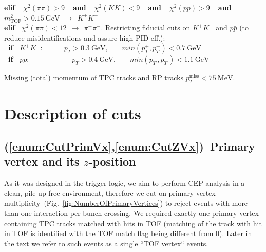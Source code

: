 \begin{enumerate}[label=\textbf{\hyperref[sec:C\arabic*]{C\arabic*}},ref=C\arabic*]
\begin{enumerate}[label=\textbf{\theenumi.\arabic*},ref=\theenumi.\arabic*]
        \textbf{elif~~}$\chi^{2}(\pi\pi)>9$\textbf{~~and~~}$\chi^{2}(KK)<9$\textbf{~~and~~}$\chi^{2}(pp)>9$\textbf{~~and~~}$m^{2}_{\text{TOF}}>0.15~\text{GeV}~~\rightarrow~~K^{+}K^{-}$\\[5pt]%
        \textbf{elif~} $\chi^{2}(\pi\pi)<12~~\rightarrow~~\pi^{+}\pi^{-}$.%
      \itemm Restricting fiducial cuts on $K^{+}K^{-}$ and $p\bar{p}$ (to reduce misidentifications and assure high PID eff.):\label{enum:CutPidPtLimits}\\[2pt]
      \textbf{~if~} $K^{+}K^{-}$:~~~~~~$p_{T}>0.3~\text{GeV}$,~~~~$min(p_{T}^{+},p_{T}^{-})<0.7~\text{GeV}$\\[2pt]%
      \textbf{~if~} $p\bar{p}$:~~~~~~~~~~~~\hspace*{1.7pt}$p_{T}>0.4~\text{GeV}$,~~~~$min(p_{T}^{+},p_{T}^{-})<1.1~\text{GeV}$%
\end{enumerate}
\itemm Missing (total) momentum of TPC tracks and RP tracks $p_{T}^{\text{miss}}<75~\text{MeV}$.\label{enum:CutMissingPt}%
 
\end{enumerate}
%
%
%
%
%
\section{Description of cuts}\label{sec:descriptionOfCuts}%
%
\subsection{(\ref{enum:CutPrimVx},\ref{enum:CutZVx})~Primary vertex and its \texorpdfstring{$z$}{z}-position}\label{sec:C1}\label{sec:C2}
As it was designed in the trigger logic, we aim to perform CEP analysis in a clean, pile-up-free environment, therefore we cut on primary vertex multiplicity~(Fig.~\ref{fig:NumberOfPrimaryVertices}) to reject events with more than one interaction per bunch crossing. We required exactly one primary vertex containing TPC tracks matched with hits in TOF (matching of the track with hit in TOF is identified with the TOF match flag being different from 0). Later in the text we refer to such events as a single ``TOF vertex`` events.

